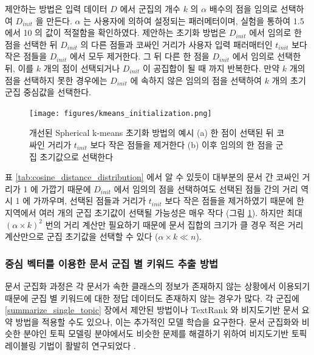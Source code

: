 \documentclass[11pt]{article}
\begin{document}
제안하는 방법은 입력 데이터 $D$ 에서 군집의 개수 $k$ 의 $\alpha$ 배수의 점을 임의로 선택하여 $D_{init}$ 을 만든다.
$\alpha$ 는 사용자에 의하여 설정되는 패러메터이며, 실험을 통하여 1.5 에서 10 의 값이 적절함을 확인하였다.
제안하는 초기화 방법은 $D_{init}$ 에서 임의로 한 점을 선택한 뒤 $D_{init}$ 의 다른 점들과 코싸인 거리가 사용자 입력 패러매터인 $t_{init}$ 보다 작은 점들을 $D_{init}$ 에서 모두 제거한다.
그 뒤 다른 한 점을 $D_{init}$ 에서 임의로 선택한 뒤, 이를 $k$ 개의 점이 선택되거나 $D_{init}$ 이 공집합이 될 때 까지 반복한다.
만약 $k$ 개의 점을 선택하지 못한 경우에는 $D_{init}$ 에 속하지 않은 임의의 점을 선택하여 $k$ 개의 초기 군집 중심값을 선택한다. 

\begin{figure}[H]
\centering
\texttt{[image: figures/kmeans\_initialization.png]}
\label{fig:initialization}
\caption{개선된 Spherical k-means 초기화 방법의 예시 (a) 한 점이 선택된 뒤 코싸인 거리가 $t_{init}$ 보다 작은 점들을 제거한다 (b) 이후 임의의 한 점을 군집 초기값으로 선택한다}
\end{figure}

표 \ref{tab:cosine_distance_distribution} 에서 알 수 있듯이 대부분의 문서 간 코싸인 거리가 1 에 가깝기 때문에 $D_{init}$ 에서 임의의 점을 선택하여도 선택된 점들 간의 거리 역시 1 에 가까우며, 선택된 점들과 거리가 $t_{init}$ 보다 작은 점들을 제거하였기 때문에 한 지역에서 여러 개의 군집 초기값이 선택될 가능성은 매우 작다 (그림 \ref{fig:initialization}).
하지만 최대 $(\alpha \times k)^2$ 번의 거리 계산만 필요하기 때문에 문서 집합의 크기가 클 경우 적은 거리 계산만으로 군집 초기값을 선택할 수 있다 ($\alpha \times k \ll n$).


\subsubsection{중심 벡터를 이용한 문서 군집 별 키워드 추출 방법}

문서 군집화 과정은 각 문서가 속한 클래스의 정보가 존재하지 않는 상황에서 이용되기 때문에 군집 별 키워드에 대한 정답 데이터도 존재하지 않는 경우가 많다.
각 군집에 \ref{summarize_single_topic} 장에서 제안된 방법이나 TextRank 와 비지도기반 문서 요약 방법을 적용할 수도 있으나, 이는 추가적인 모델 학습을 요구한다.
문서 군집화와 비슷한 분야인 토픽 모델링 분야에서도 비슷한 문제를 해결하기 위하여 비지도기반 토픽 레이블링 기법이 활발히 연구되었다 \citep{newman2010evaluating, sievert2014ldavis, chuang2012interpretation, snyder2013topic, chuang2012termite, blei2003latent}.
\end{document}
